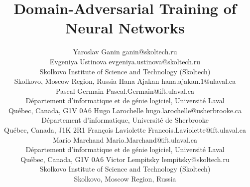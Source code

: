 \documentclass[twoside,11pt]{article}
\begin{document}
 

\title{Domain-Adversarial Training of Neural Networks}



\author{\name Yaroslav Ganin \email ganin@skoltech.ru\\
\name Evgeniya Ustinova \email evgeniya.ustinova@skoltech.ru\\
	\addr 
Skolkovo Institute of Science and Technology (Skoltech)\\
Skolkovo, Moscow Region, Russia	
\AND
\name Hana Ajakan \email hana.ajakan.1@ulaval.ca\\
\name Pascal Germain   \email Pascal.Germain@ift.ulaval.ca \\
	\addr D{\'e}partement d'informatique et de g\'enie logiciel,
	Universit\'e Laval  \\
	Qu\'ebec, Canada,
	G1V 0A6
\AND
\name Hugo Larochelle    \email hugo.larochelle@usherbrooke.ca \\
	\addr D{\'e}partement d'informatique, 
	Universit\'e de Sherbrooke  \\
	Qu\'ebec, Canada,
	J1K 2R1 
\AND
\name Fran\c{c}ois Laviolette    \email Francois.Laviolette@ift.ulaval.ca \\
\name Mario Marchand    \email Mario.Marchand@ift.ulaval.ca \\
	\addr D{\'e}partement d'informatique et de g\'enie logiciel, 
	Universit\'e Laval  \\
	Qu\'ebec, Canada,
	G1V 0A6    
\AND
\name Victor Lempitsky    \email lempitsky@skoltech.ru \\
	\addr 
Skolkovo Institute of Science and Technology (Skoltech)\\
Skolkovo, Moscow Region, Russia	
}


\maketitle
\end{document}
